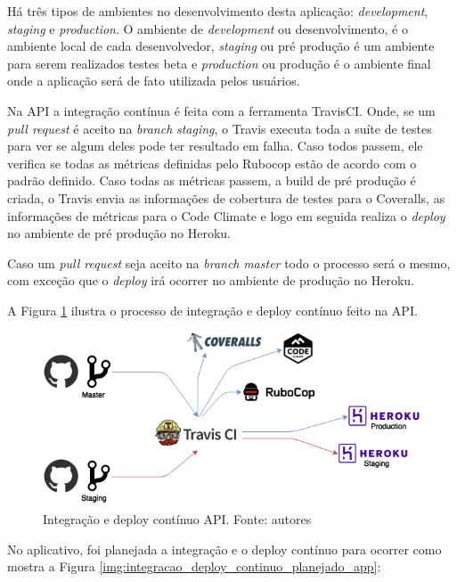 Há três tipos de ambientes no desenvolvimento desta aplicação: \textit{development}, \textit{staging} e \textit{production}. O ambiente de \textit{development} ou desenvolvimento, é o ambiente local de cada desenvolvedor, \textit{staging} ou pré produção é um ambiente para serem realizados testes beta e \textit{production} ou produção é o ambiente final onde a aplicação será de fato utilizada pelos usuários.

Na API a integração contínua é feita com a ferramenta TravisCI. Onde, se um \textit{pull request} é aceito na \textit{branch} \textit{staging}, o Travis executa toda a suíte de testes para ver se algum deles pode ter resultado em falha. Caso todos passem, ele verifica se todas as métricas definidas pelo Rubocop estão de acordo com o padrão definido. Caso todas as métricas passem, a build de pré produção é criada, o Travis envia as informações de cobertura de testes para o Coveralls, as informações de métricas para o Code Climate e logo em seguida realiza o \textit{deploy} no ambiente de pré produção no Heroku.

Caso um \textit{pull request} seja aceito na \textit{branch} \textit{master} todo o processo será o mesmo, com exceção que o \textit{deploy} irá ocorrer no ambiente de produção no Heroku.

A Figura \ref{img:integracao_deploy_continuo_api} ilustra o processo de integração e deploy contínuo feito na API.

\begin{figure}[H]
    \centering
    \includegraphics[scale=0.5]{figuras/api_ci.png}
    \caption[Integração e deploy contínuo API]{Integração e deploy contínuo API. Fonte: autores}
    \label{img:integracao_deploy_continuo_api}
\end{figure}

No aplicativo, foi planejada a integração e o deploy contínuo para ocorrer como mostra a Figura \ref{img:integracao_deploy_continuo_planejado_app}:


